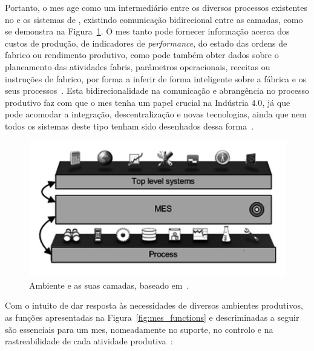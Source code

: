 Portanto, o \gls{mes} age como um intermediário entre os diversos processos existentes no  e os sistemas de , existindo comunicação bidirecional entre as camadas, como se demonstra na Figura~\ref{fig:mes_layers}. O \gls{mes} tanto pode fornecer informação acerca dos custos de produção, de indicadores de \textit{performance}, do estado das ordens de fabrico ou rendimento produtivo, como pode também obter dados sobre o planeamento das atividades fabris, parâmetros operacionais, receitas ou instruções de fabrico, por forma a inferir de forma inteligente sobre a fábrica e os seus processos~\parencite{mes_explained_high_level_vision}. Esta bidirecionalidade na comunicação e abrangência no processo produtivo faz com que o \gls{mes} tenha um papel crucial na Indústria $4.0$, já que pode acomodar a integração, descentralização e novas tecnologias, ainda que nem todos os sistemas deste tipo tenham sido desenhados dessa forma~\parencite{cmf_mes_definition}.

\begin{figure}[!ht]
    \centering
    \includegraphics[width=.75\textwidth]{ch02/assets/mes_layers.jpg}
    \caption{Ambiente  e as suas camadas, baseado em~\textcite[p.~526]{mes_literature_review}.}
    \label{fig:mes_layers}
\end{figure}

Com o intuito de dar resposta às necessidades de diversos ambientes produtivos, as funções apresentadas na Figura~\ref{fig:mes_functions} e descriminadas a seguir são essenciais para um \gls{mes}, nomeadamente no suporte, no controlo e na rastreabilidade de cada atividade produtiva~\parencite{mes_literature_review, mes_explained_high_level_vision, introduction_mes}:

